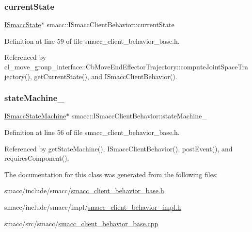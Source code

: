 \subsubsection{\texorpdfstring{current\+State}{currentState}}
{\footnotesize\ttfamily \hyperlink{classsmacc_1_1ISmaccState}{I\+Smacc\+State}$\ast$ smacc\+::\+I\+Smacc\+Client\+Behavior\+::current\+State\hspace{0.3cm}{\ttfamily [private]}}



Definition at line 59 of file smacc\+\_\+client\+\_\+behavior\+\_\+base.\+h.



Referenced by cl\+\_\+move\+\_\+group\+\_\+interface\+::\+Cb\+Move\+End\+Effector\+Trajectory\+::compute\+Joint\+Space\+Trajectory(), get\+Current\+State(), and I\+Smacc\+Client\+Behavior().

\mbox{\label{classsmacc_1_1ISmaccClientBehavior_a0fea65db292a8bb3dfba3e5840491d79}} 
\subsubsection{\texorpdfstring{state\+Machine\+\_\+}{stateMachine\_}}
{\footnotesize\ttfamily \hyperlink{classsmacc_1_1ISmaccStateMachine}{I\+Smacc\+State\+Machine}$\ast$ smacc\+::\+I\+Smacc\+Client\+Behavior\+::state\+Machine\+\_\+\hspace{0.3cm}{\ttfamily [private]}}



Definition at line 56 of file smacc\+\_\+client\+\_\+behavior\+\_\+base.\+h.



Referenced by get\+State\+Machine(), I\+Smacc\+Client\+Behavior(), post\+Event(), and requires\+Component().



The documentation for this class was generated from the following files\+:\begin{DoxyCompactItemize}
\item 
smacc/include/smacc/\hyperlink{include_2smacc_2smacc__client__behavior__base_8h}{smacc\+\_\+client\+\_\+behavior\+\_\+base.\+h}\item 
smacc/include/smacc/impl/\hyperlink{smacc__client__behavior__impl_8h}{smacc\+\_\+client\+\_\+behavior\+\_\+impl.\+h}\item 
smacc/src/smacc/\hyperlink{smacc__client__behavior__base_8cpp}{smacc\+\_\+client\+\_\+behavior\+\_\+base.\+cpp}\end{DoxyCompactItemize}
